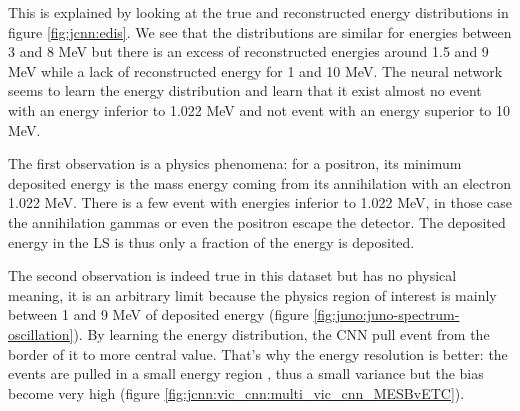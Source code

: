 This is explained by looking at the true and reconstructed energy distributions in figure \ref{fig:jcnn:edis}. We see that the distributions are similar for energies between 3 and 8 MeV but there is an excess of reconstructed energies around 1.5 and 9 MeV while a lack of reconstructed energy for 1 and 10 MeV. The neural network seems to learn the energy distribution and learn that it exist almost no event with an energy inferior to 1.022 MeV and not event with an energy superior to 10 MeV.

The first observation is a physics phenomena: for a positron, its minimum deposited energy is the mass energy coming from its annihilation with an electron 1.022 MeV. There is a few event with energies inferior to 1.022 MeV, in those case the annihilation gammas or even the positron escape the detector. The deposited energy in the LS is thus only a fraction of the energy is deposited.

The second observation is indeed true in this dataset but has no physical meaning, it is an arbitrary limit because the physics region of interest is mainly between 1 and 9 MeV of deposited energy (figure \ref{fig:juno:juno-spectrum-oscillation}). By learning the energy distribution, the CNN pull event from the border of it to more central value. That's why the energy resolution is better: the events are pulled in a small energy region , thus a small variance but the bias become very high (figure \ref{fig:jcnn:vic_cnn:multi_vic_cnn_MESBvETC}).


